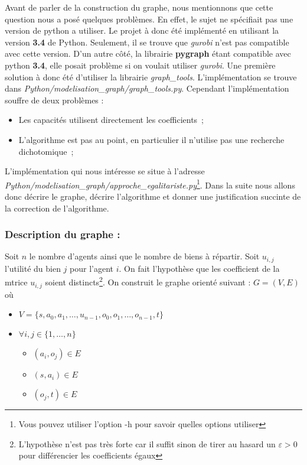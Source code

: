 \documentclass[a4paper, titlepage, oneside, 12pt]{article}%
\begin{document}
Avant de parler de la construction du graphe, nous mentionnons que cette question nous a posé quelques problèmes. En effet, le sujet ne spécifiait pas une version de python a utiliser. Le projet à donc été implémenté en utilisant la version \textbf{3.4} de Python. Seulement, il se trouve que \textit{gurobi} n'est pas compatible avec cette version. D'un autre côté, la librairie \textbf{pygraph} étant compatible avec python \textbf{3.4}, elle posait problème si on voulait utiliser \textit{gurobi}. Une première solution à donc été d'utiliser la librairie \textit{graph\_tools}. L'implémentation se trouve dans \textit{Python/modelisation\_graph/graph\_tools.py}. Cependant l'implémentation souffre de deux problèmes :
\begin{itemize}
\item Les capacités utilisent directement les coefficients~;
\item L'algorithme est pas au point, en particulier il n'utilise pas une recherche dichotomique~;
\end{itemize}

L'implémentation qui nous intéresse se situe à l'adresse \textit{Python/modelisation\_graph/approche\_egalitariste.py}\footnote{Vous pouvez utiliser l'option -h pour savoir quelles options utiliser}. Dans la suite nous allons donc décrire le graphe, décrire l'algorithme et donner une justification succinte de la correction de l'algorithme.

\subsubsection{Description du graphe : } 

Soit $n$ le nombre d'agents ainsi que le nombre de biens à répartir. Soit $u_{i,j}$ l'utilité du bien $j$ pour l'agent $i$. 
On fait l'hypothèse que les coefficient de la mtrice $u_{i,j}$ soient distincts\footnote{L'hypothèse n'est pas très forte car il suffit sinon de tirer au hasard un $\varepsilon>0$ pour différencier les coefficients égaux}. 
On construit le graphe orienté suivant :
$G=(V,E)$ où 
\begin{itemize}
\item $V=\{s,a_0,a_1,\dots, u_{n-1}, o_0,o_1,\dots, o_{n-1},t\}$
\item $\forall i,j \in \{1,\dots, n\} $
  \begin{itemize}
  \item $(a_i,o_j)\in E $
  \item $(s,a_i)\in E$
  \item $(o_j,t) \in E$
  \end{itemize}
\end{itemize}  
\end{document}
